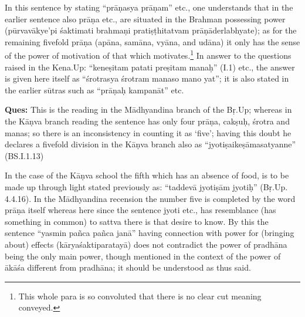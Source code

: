 In this sentence by stating “prāṇasya prāṇam” etc., one understands that in the earlier sentence also prāṇa etc., are situated in the Brahman possessing power (pūrvavākye’pi śaktimati brahmaṇi pratiṣṭhitatvam prāṇāderlabhyate); as for the remaining fivefold prāṇa (apāna, samāna, vyāna, and udāna) it only has the sense of the power of motivation of that which motivates.\footnote{This whole para is so convoluted that there is no clear cut meaning conveyed.} In answer to the questions raised in the Kena.Up: “keneṣitam patati preṣitam manaḥ” (I.1) etc.,  the answer is given here itself as “śrotrasya śrotram manaso mano yat”; it is also stated in the earlier sūtras such as “prāṇaḥ kampanāt” etc. 

\textbf{Ques:} This is the reading in the Mādhyandina branch of the Bṛ.Up; whereas in the  Kāṇva branch reading the sentence has only four  prāṇa, cakṣuḥ, śrotra and manas; so there is an inconsistency in counting it as ‘five’;  having this doubt he declares a fivefold division in the Kāṇva branch also as “jyotiṣaikeṣāmasatyanne” (BS.I.1.13)

\vskip -2pt

\textbf{}

\vskip -2pt


\vskip -2pt


\vskip -2pt

In the case of the Kāṇva school the fifth which has an absence of food, is to be made up through light stated previously as: “taddevā jyotiṣām jyotiḥ” (Bṛ.Up. 4.4.16). In the Mādhyandina recension the number five is completed by the word prāṇa itself whereas here since the sentence jyoti etc., has resemblance (has something in common) to sattva there is that desire to know. By this the sentence “yasmin pañca pañca janā” having connection with power for (bringing about) effects (kāryaśaktiparatayā) does not contradict the power of pradhāna being the only main power, though mentioned in the context of the power of ākāśa different from pradhāna; it should be understood as thus said.

